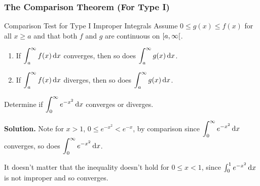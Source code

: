 \subsubsection{The Comparison Theorem (For Type I)}
\begin{Theorem}{Comparison Test for Type I Improper Integrals}{}
    Assume $ 0\leqslant g(x)\leqslant f(x) $ for all $ x\geqslant a $
    and that both $ f $ and $ g $ are continuous on $ \interval[open right]{a}{\infty} $.
    \begin{enumerate}[label=(\arabic*)]
        \item If $ \displaystyle \int_a^{\infty}f(x)\odif{x} $ converges, then so does
            $ \displaystyle \int_a^{\infty}g(x)\odif{x} $.
        \item If $ \displaystyle \int_a^{\infty}f(x)\odif{x} $ diverges, then so does
            $ \displaystyle \int_a^{\infty}g(x)\odif{x} $.
    \end{enumerate}
\end{Theorem}
\begin{Example}{}{}
    Determine if $ \displaystyle \int_0^\infty e^{-x^2}\odif{x} $ converges or diverges.

    \textbf{Solution.} Note for $ x>1 $,
    $ 0\leqslant e^{-x^2} <e^{-x} $, by comparison since
    $ \displaystyle \int_{0}^{\infty} e^{-x^2}\odif{x} $ converges, so does
    $ \displaystyle \int_{0}^{\infty} e^{-x^2}\odif{x} $.
\end{Example}
\begin{Remark}{}{}
    It doesn't matter that the inequality doesn't hold for $ 0\leqslant x<1 $,
    since $ \int_{0}^{1}e^{-x^2} \odif{x} $ is not improper and so converges.
\end{Remark}

